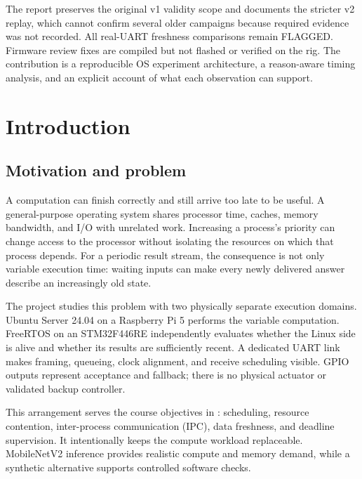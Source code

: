 \documentclass[a4paper,11pt]{article}
\newcommand{\page}{\clearpage}
\begin{document}
The report preserves the original v1 validity scope and documents the stricter v2 replay, which cannot confirm several older campaigns because required evidence was not recorded. All real-UART freshness comparisons remain FLAGGED. Firmware review fixes are compiled but not flashed or verified on the rig. The contribution is a reproducible OS experiment architecture, a reason-aware timing analysis, and an explicit account of what each observation can support.


\page
\section{Introduction}
\subsection{Motivation and problem}
A computation can finish correctly and still arrive too late to be useful. A general-purpose operating system shares processor time, caches, memory bandwidth, and I/O with unrelated work. Increasing a process's priority can change access to the processor without isolating the resources on which that process depends. For a periodic result stream, the consequence is not only variable execution time: waiting inputs can make every newly delivered answer describe an increasingly old state.

The project studies this problem with two physically separate execution domains. Ubuntu Server 24.04 on a Raspberry Pi 5 performs the variable computation. FreeRTOS on an STM32F446RE independently evaluates whether the Linux side is alive and whether its results are sufficiently recent. A dedicated UART link makes framing, queueing, clock alignment, and receive scheduling visible. GPIO outputs represent acceptance and fallback; there is no physical actuator or validated backup controller.

This arrangement serves the course objectives in : scheduling, resource contention, inter-process communication (IPC), data freshness, and deadline supervision. It intentionally keeps the compute workload replaceable. MobileNetV2 inference provides realistic compute and memory demand, while a synthetic alternative supports controlled software checks.
\end{document}
